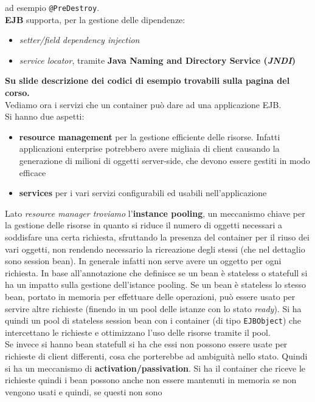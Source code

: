 \documentclass[a4paper,12pt, oneside]{book}
\begin{document}
ad esempio \texttt{@PreDestroy}. \\
\textbf{EJB} supporta, per la gestione delle dipendenze:
\begin{itemize}
  \item \textit{setter/field dependency injection}
  \item \textit{service locator}, tramite \textbf{Java Naming and Directory
    Service (\textit{JNDI})}
\end{itemize}
\textbf{Su slide descrizione dei codici di esempio trovabili sulla pagina del
  corso.}\\ 
Vediamo ora i servizi che un container può dare ad una applicazione EJB.\\
Si hanno due aspetti:
\begin{itemize}
  \item \textbf{resource management} per la gestione efficiente delle
  risorse. Infatti applicazioni enterprise potrebbero avere migliaia di client
  causando la generazione di milioni di oggetti server-side, che devono essere
  gestiti in modo efficace 
  \item \textbf{services} per i vari servizi configurabili ed usabili
  nell'applicazione 
\end{itemize}
Lato \textit{resource manager troviamo} l'\textbf{instance pooling}, un
meccanismo chiave per la gestione delle 
risorse in quanto si riduce il numero di oggetti necessari a soddisfare una
certa richiesta, sfruttando la presenza del container per il riuso dei vari
oggetti, non rendendo necessario la ricreazione degli stessi (che nel
dettaglio sono session bean). In generale infatti non serve avere un oggetto
per ogni richiesta. In base all'annotazione che definisce se un bean è
stateless o statefull si ha un impatto sulla gestione dell'istance pooling. Se
un bean è stateless lo stesso bean, portato in memoria per effettuare delle
operazioni, può essere usato per servire altre richieste (finendo in un pool
delle istanze con lo stato \textit{ready}). Si ha quindi un pool di stateless
session bean con i container (di tipo \texttt{EJBObject}) che intercettano le
richieste e ottimizzano l'uso delle risorse tramite il pool. \\
Se invece si hanno bean statefull si ha che essi non possono essere usate per
richieste di client differenti, cosa che porterebbe ad ambiguità nello stato.
Quindi si ha un meccanismo di \textbf{activation/passivation}. Si ha il
container che riceve le richieste quindi i bean possono anche non essere
mantenuti in memoria se non vengono usati e quindi, se questi non sono
\end{document}
